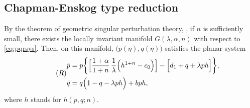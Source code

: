 \documentclass[graybox]{svmult}
\def\dpp{\dot{p}}
\def\dqq{\dot{q}}
\begin{document}
\subsection{Chapman-Enskog type reduction}
By the theorem of geometric singular perturbation theory, \cite{fenichel_geometric_1979, KUEHN_2015}, if $n$ is sufficiently small, there exists  the locally invariant manifold $G(\lambda,\alpha,n)$ with respect to \eqref{eq:pqrsys}. Then, on this manifold, $\big(p(\eta),q(\eta)\big)$ satisfies the planar system
\begin{equation} \tag*{(${R}$)} \label{eq:reduced}
\begin{aligned}
 {\dpp}&=p\bigg\{\Big[\frac{1+\alpha}{1+n}\,\frac{1}{\lambda }\Big(h^{1+n}-c_0\Big)\Big] -\Big[d_1 + q + \lambda ph\Big]\bigg\},\\
 {\dqq}&=q\Big(1-q-\lambda p h\Big) + bph,\\
\end{aligned}
\end{equation}
where $h$ stands for $h(p,q;n)$.
\end{document}
